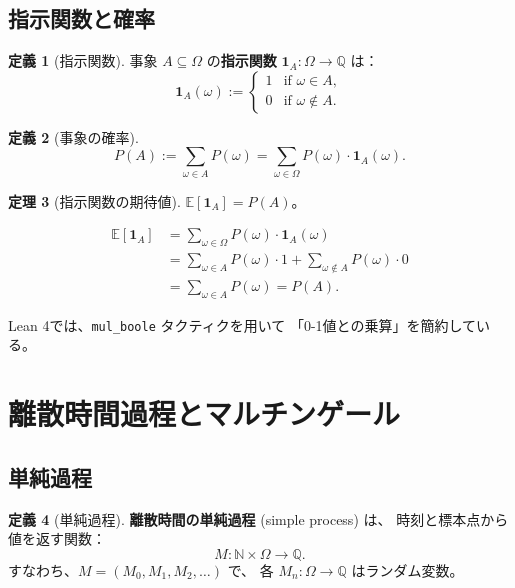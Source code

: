 \documentclass[a4paper,12pt]{ltjsarticle}
\theoremstyle{definition}
\newtheorem{definition}{定義}[section]
\newtheorem{theorem}[definition]{定理}
\begin{document}
\subsection{指示関数と確率}

\begin{definition}[指示関数]
事象 $A \subseteq \Omega$ の\textbf{指示関数} $\mathbf{1}_A : \Omega \to \mathbb{Q}$ は：
\[
  \mathbf{1}_A(\omega) := \begin{cases}
    1 & \text{if } \omega \in A, \\
    0 & \text{if } \omega \notin A.
  \end{cases}
\]
\end{definition}

\begin{definition}[事象の確率]
\[
  P(A) := \sum_{\omega \in A} P(\omega) = \sum_{\omega \in \Omega} P(\omega) \cdot \mathbf{1}_A(\omega).
\]
\end{definition}

\begin{theorem}[指示関数の期待値]
$\mathbb{E}[\mathbf{1}_A] = P(A)$。
\end{theorem}

\begin{proofbox}[証明のスケッチ]
\begin{align*}
  \mathbb{E}[\mathbf{1}_A]
  &= \sum_{\omega \in \Omega} P(\omega) \cdot \mathbf{1}_A(\omega) \\
  &= \sum_{\omega \in A} P(\omega) \cdot 1 + \sum_{\omega \notin A} P(\omega) \cdot 0 \\
  &= \sum_{\omega \in A} P(\omega) = P(A).
\end{align*}

Lean 4では、\texttt{mul\_boole} タクティクを用いて
「0-1値との乗算」を簡約している。
\end{proofbox}

\section{離散時間過程とマルチンゲール}

\subsection{単純過程}

\begin{definition}[単純過程]
\textbf{離散時間の単純過程} (simple process) は、
時刻と標本点から値を返す関数：
\[
  M : \mathbb{N} \times \Omega \to \mathbb{Q}.
\]
すなわち、$M = (M_0, M_1, M_2, \ldots)$ で、
各 $M_n : \Omega \to \mathbb{Q}$ はランダム変数。
\end{definition}
\end{document}
